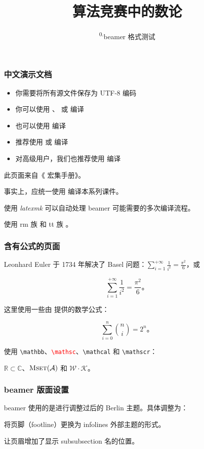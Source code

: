 \documentclass{../pkslide}
\title[算法竞赛中的数论（零）]{算法竞赛中的数论}
\subtitle{\texorpdfstring{\textsuperscript{0.}}{0. }beamer 格式测试}
\begin{document}
\begin{frame}
  \frametitle{中文演示文档}
  
  \begin{itemize}
    \item 你需要将所有源文件保存为 UTF-8 编码
    \item 你可以使用 \XeLaTeX{}、\LuaLaTeX{} 或 \upLaTeX{} 编译
    \item 也可以使用 \pdfLaTeX{} 编译
    \item 推荐使用 \XeLaTeX{} 或 \LuaLaTeX{} 编译
    \item 对高级用户，我们也推荐使用 \upLaTeX{} 编译
  \end{itemize}
  
  此页面来自《\CTeX{} 宏集手册》。
  
  事实上，应统一使用 \XeLaTeX{} 编译本系列课件。
  
  使用 \emph{latexmk} 可以自动处理 {\sffamily beamer} 可能需要的多次编译流程。
  
  使用 rm 族 \textrm{\XeLaTeX} 和 tt 族 \texttt{\XeLaTeX}。
\end{frame}

\begin{frame}
  \frametitle{含有公式的页面}
  
  Leonhard Euler 于 1734 年解决了 Basel 问题：$\sum_{i = 1}^{+\infty} \frac{1}{i^2} = \frac{\pi^2}{6}$，或
  
  \[ \sum_{i = 1}^{+\infty} \frac{1}{i^2} = \frac{\pi^2}{6} \text{。} \]
  
  这里使用一些由 \AmSLaTeX{} 提供的数学公式：
  
  \[ \sum_{i = 0}^{n} \binom{n}{i} = 2^n \text{。} \]
  
  使用 \texttt{\textbackslash{}mathbb}、\textcolor{red}{\texttt{\textbackslash{}mathsc}}、\texttt{\textbackslash{}mathcal} 和 \texttt{\textbackslash{}mathscr}：
  
  $\mathbb{R} \subset \mathbb{C}$、${\text{\rmfamily{}\scshape{}Mset}}(\mathcal{A})$ 和 $\mathscr{W} \cdot \mathscr{K}$。
\end{frame}

\begin{frame}
  \frametitle{beamer 版面设置}
  
  beamer 使用的是进行调整过后的 Berlin 主题。具体调整为：
  
  将页脚（footline）更换为 infolines 外部主题的形式。
  
  让页眉增加了显示 subsubsection 名的位置。
\end{frame}
\end{document}
